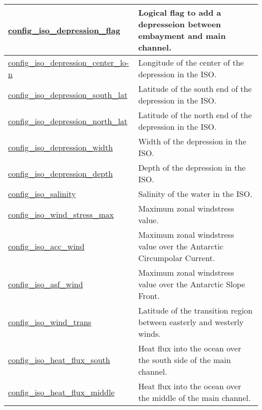 {\begin{center}
\begin{longtable}{| p{2.0in} || p{4.0in} |}
    \hline
    \hyperref[subsec:nm_sec_config_iso_depression_flag]{config\_iso\_depression\_flag} & Logical flag to add a depresseion between embayment and main channel. \\
    \hline
    \hyperref[subsec:nm_sec_config_iso_depression_center_lon]{config\_iso\_depression\_center\_lo-}\hyperref[subsec:nm_sec_config_iso_depression_center_lon]{n}& Longitude of the center of the depression in the ISO. \\
    \hline
    \hyperref[subsec:nm_sec_config_iso_depression_south_lat]{config\_iso\_depression\_south\_lat} & Latitude of the south end of the depression in the ISO. \\
    \hline
    \hyperref[subsec:nm_sec_config_iso_depression_north_lat]{config\_iso\_depression\_north\_lat} & Latitude of the north end of the depression in the ISO. \\
    \hline
    \hyperref[subsec:nm_sec_config_iso_depression_width]{config\_iso\_depression\_width} & Width of the depression in the ISO. \\
    \hline
    \hyperref[subsec:nm_sec_config_iso_depression_depth]{config\_iso\_depression\_depth} & Depth of the depression in the ISO. \\
    \hline
    \hyperref[subsec:nm_sec_config_iso_salinity]{config\_iso\_salinity} & Salinity of the water in the ISO. \\
    \hline
    \hyperref[subsec:nm_sec_config_iso_wind_stress_max]{config\_iso\_wind\_stress\_max} & Maximum zonal windstress value. \\
    \hline
    \hyperref[subsec:nm_sec_config_iso_acc_wind]{config\_iso\_acc\_wind} & Maximum zonal windstress value over the Antarctic Circumpolar Current. \\
    \hline
    \hyperref[subsec:nm_sec_config_iso_asf_wind]{config\_iso\_asf\_wind} & Maximum zonal windstress value over the Antarctic Slope Front. \\
    \hline
    \hyperref[subsec:nm_sec_config_iso_wind_trans]{config\_iso\_wind\_trans} & Latitude of the transition region between easterly and westerly winds. \\
    \hline
    \hyperref[subsec:nm_sec_config_iso_heat_flux_south]{config\_iso\_heat\_flux\_south} & Heat flux into the ocean over the south side of the main channel. \\
    \hline
    \hyperref[subsec:nm_sec_config_iso_heat_flux_middle]{config\_iso\_heat\_flux\_middle} & Heat flux into the ocean over the middle of the main channel. \\

\end{longtable}
\end{center}}

